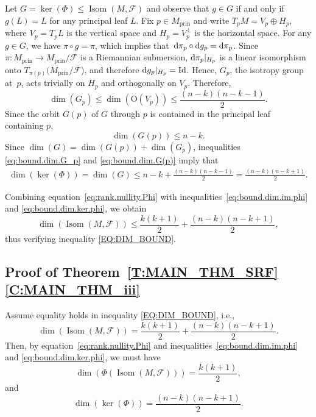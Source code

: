 \documentclass[pdftex]{sigma}
\numberwithin{equation}{section}
\theoremstyle{definition}
\DeclareMathOperator{\Iso}{Isom}
\newcommand{\prin}{\mathrm{prin}}
\newcommand{\fol}{\mathcal{F}}
\begin{document}
Let $G = \ker(\Phi)\leq \Iso(M,\fol)$ and observe that $g\in G$ if and only if $g(L) = L$ for any principal leaf $L$.
Fix $p\in M_\prin$ and write $T_pM = V_p\oplus H_p$, where $V_p=T_pL$ is the vertical space and $H_p = V_p^\perp$ is the horizontal space.
For any $g\in G$, we have $\pi\circ g = \pi$, which implies that~${{\rm d}\pi_p\circ {\rm d}g_p = {\rm d}\pi_p}$.
Since $\pi\colon M_\prin\to M_\prin/\fol$ is a Riemannian submersion, ${\rm d}\pi_p|_{H_p}$ is a linear isomorphism onto $T_{\pi(p)}(M_\prin/\fol$), and therefore ${\rm d}g_p|_{H_p}=\mathrm{Id}$. Hence, $G_p$, the isotropy group at~$p$, acts trivially on $H_p$ and orthogonally on $V_p$.
Therefore,
\begin{equation}
\label{eq:bound.dim.G_p}
\dim(G_p)\leq \dim(\mathrm{O}(V_p)) \leq \frac{(n-k)(n-k-1)}{2}.
\end{equation}
Since the orbit $G(p)$ of $G$ through $p$ is contained in the principal leaf containing $p$,
\begin{equation}
\label{eq:bound.dim.G(p)}
\dim(G(p))\leq n-k.
\end{equation}
Since $\dim(G) = \dim(G(p)) + \dim(G_p)$, inequalities \eqref{eq:bound.dim.G_p} and \eqref{eq:bound.dim.G(p)} imply that
 \begin{align}
 \label{eq:bound.dim.ker.phi}
 \dim(\ker (\Phi)) = \dim(G)
 \leq n-k +\frac{(n-k)(n-k-1)}{2} = \frac{(n-k)(n-k+1)}{2}.
 \end{align}

Combining equation~\eqref{eq:rank.nullity.Phi} with inequalities~\eqref{eq:bound.dim.im.phi} and \eqref{eq:bound.dim.ker.phi}, we obtain
\begin{equation}
\label{eq:bound.dim.Iso(M,F)}
\dim(\Iso(M,\fol)) \leq \frac{k(k+1)}{2} + \frac{(n-k)(n-k+1)}{2},
\end{equation}
thus verifying inequality \eqref{EQ:DIM_BOUND}.



\subsection[Proof of Theorem A (iii)]{Proof of Theorem~\ref{T:MAIN_THM_SRF}\,\ref{C:MAIN_THM_iii}}


Assume equality holds in inequality \eqref{EQ:DIM_BOUND}, i.e.,
\[
\dim(\Iso(M,\fol)) = \frac{k(k+1)}{2} + \frac{(n-k)(n-k+1)}{2}.
\]
Then, by equation~\eqref{eq:rank.nullity.Phi} and inequalities~\eqref{eq:bound.dim.im.phi} and \eqref{eq:bound.dim.ker.phi},
we must have
\begin{equation}
\label{eq:equality.dim.im.Phi}
\dim(\Phi(\Iso(M,\fol))) = \frac{k(k+1)}{2},
\end{equation}
and
\begin{equation}
\label{eq:equality.dim.ker.Phi}
\dim(\ker (\Phi))=\frac{(n-k)(n-k+1)}{2}.
\end{equation}
\end{document}

